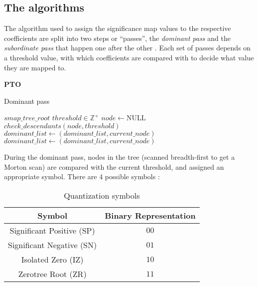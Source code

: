 \documentclass[./A14_Report.tex]{subfiles}
\begin{document}
\subsection{The algorithms}
The algorithm used to assign the significance map values to the respective
coefficients are split into two steps or ``passes'', the \textit{dominant pass}
and the \textit{subordinate pass} that happen one after the other
\cite{shap1993}. Each set of passes depends on a threshold value, with which
coefficients are compared with to decide what value they are mapped to.
\par
\textbf{PTO}

\begin{algorithm}[H]
    \caption{Dominant pass}
    \label{alg:dompass}
    \begin{algorithmic}
        \Require $smap\_tree\_root$ 
        \Require $threshold \in \mathbb{Z}^+$
        \State $node \gets \text{NULL}$
            \State $check\_descendants(node, threshold)$
                \State $dominant\_list \gets (dominant\_list, current\_node)$
                    \State $dominant\_list \gets (dominant\_list, current\_node)$
                \EndIf
            \EndIf
        \EndFor
    \end{algorithmic}
\end{algorithm}

During the dominant pass, nodes in the tree (scanned breadth-first to get a
Morton scan) are compared with the current threshold, and assigned an
appropriate symbol. There are 4 possible symbols \cite{valezw1999}:\\

\begin{table}[H]
    \centering
    \begin{tabular}{|c|c|}
        \hline
        \textbf{Symbol} & \textbf{Binary Representation}\\
        \hline
        Significant Positive (SP) & $00$\\
        Significant Negative (SN) & $01$\\
        Isolated Zero (IZ) & $10$\\
        Zerotree Root (ZR) & $11$\\
        \hline
    \end{tabular}
    \caption{Quantization symbols}
    \label{tab:qsymbs}
\end{table}
\end{document}
